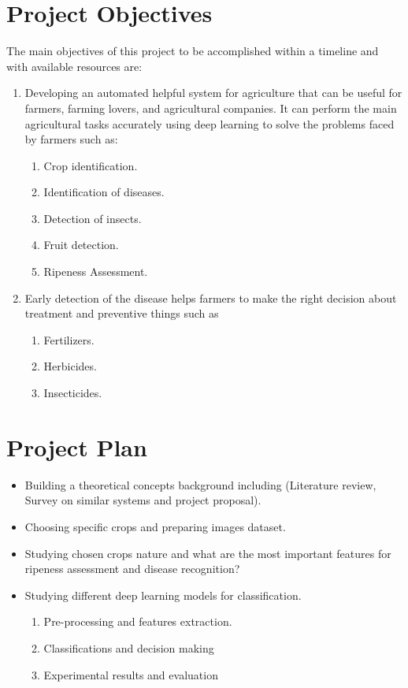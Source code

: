 \section{Project Objectives}

The main objectives of this project to be accomplished within 
a timeline and with available resources are:

\begin{enumerate}
    \item Developing an automated helpful system for agriculture that can be useful 
        for farmers, farming lovers, and agricultural companies. It can perform the main agricultural 
        tasks accurately using deep learning to solve the 
        problems faced by farmers such as:
        \begin{enumerate}
            \item Crop identification.
            \item Identification of diseases.
            \item Detection of insects.
            \item Fruit detection.
            \item Ripeness Assessment.
        \end{enumerate}
    \item Early detection of the disease helps farmers to make the right 
        decision about treatment and preventive things such as
        \begin{enumerate}
            \item Fertilizers.
            \item Herbicides.
            \item Insecticides.
        \end{enumerate}
\end{enumerate}

\section{Project Plan}

\begin{itemize}
    \item Building a theoretical concepts background including 
        (Literature review, Survey on similar systems and project proposal).
    \item Choosing specific crops and preparing images dataset.
    \item Studying chosen crops nature and what are the most important 
        features for ripeness assessment and disease recognition?
    \item Studying different deep learning models for classification.
        \begin{enumerate}
            \item Pre-processing and features extraction.
            \item Classifications and decision making
            \item Experimental results and evaluation
        \end{enumerate}
\end{itemize}

